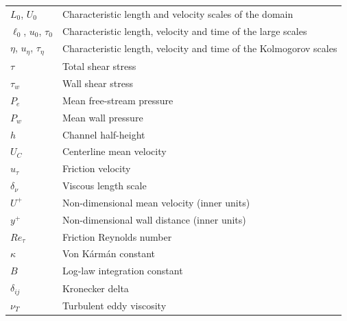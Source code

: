 \documentclass[12pt, a4paper, twoside, openright]{book}
\begin{document}
\begin{longtable}{p{} p{}}
	\addlinespace
	$L_0$, $U_0$                                 & Characteristic length and velocity scales of the domain                      \\
	$\ell_0$, $u_0$, $\tau_0$                    & Characteristic length, velocity and time of the large scales                 \\
	$\eta$, $u_\eta$, $\tau_\eta$                & Characteristic length, velocity and time of the Kolmogorov scales            \\

	\addlinespace
	$\tau$                                       & Total shear stress \\
	$\tau_w$                                     & Wall shear stress \\
    $P_e$		                                 & Mean free-stream pressure \\
    $P_w$                                        & Mean wall pressure \\
	$h$                                          & Channel half-height \\
    $U_C$                                        & Centerline mean velocity \\
    $u_\tau$                                     & Friction velocity \\
    $\delta_\nu$                                 & Viscous length scale \\
    $U^+$                                        & Non-dimensional mean velocity (inner units) \\
	$y^+$                                        & Non-dimensional wall distance (inner units) \\
    $Re_\tau$                                    & Friction Reynolds number \\
    $\kappa$                                     & Von Kármán constant \\
    $B$                                          & Log-law integration constant \\

	\addlinespace
	\addlinespace
	$\delta_{ij}$								 & Kronecker delta \\
	$\nu_T$										 & Turbulent eddy viscosity \\


\end{longtable}
\end{document}
